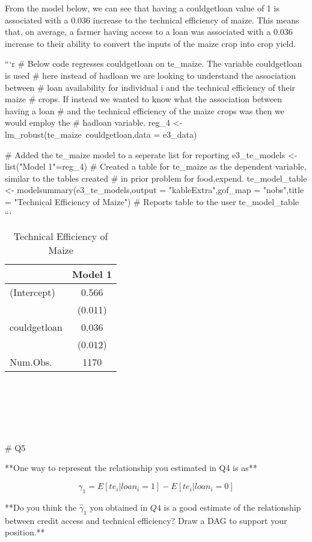 \documentclass[
]{article}
\begin{document}
\begin{}
From the model below, we can see that having a couldgetloan value of 1 is associated with a 0.036 increase to the technical efficiency of maize. This means that, on average, a farmer having access to a loan was associated with a 0.036 increase to their ability to convert the inputs of the maize crop into crop yield. 
\

```r
# Below code regresses couldgetloan on te_maize. The variable couldgetloan is used
# here instead of hadloan we are looking to understand the association between 
# loan availability for individual i and the technical efficiency of their maize
# crops. If instead we wanted to know what the association between having a loan
# and the technical efficiency of the maize crops was then we would employ the
# hadloan variable. 
reg_4 <- lm_robust(te_maize~couldgetloan,data = e3_data)

# Added the te_maize model to a seperate list for reporting
e3_te_models <- list("Model 1"=reg_4)
# Created a table for te_maize as the dependent variable, similar to the tables created
# in prior problem for food.expend. 
te_model_table <- modelsummary(e3_te_models,output = "kableExtra",gof_map = "nobs",title = "Technical Efficiency of Maize") %
# Reports table to the user
te_model_table
```

\begin{table}

\caption{\label{tab:unnamed-chunk-7}Technical Efficiency of Maize}
\centering
\begin{tabular}[t]{lc}
\toprule
  & Model 1\\
\midrule
(Intercept) & \num{0.566}\\
 & (\num{0.011})\\
couldgetloan & \num{0.036}\\
 & (\num{0.012})\\
\midrule
Num.Obs. & \num{1170}\\
\bottomrule
\end{tabular}
\end{table}
\

\

\


# Q5

**One way to represent the relationship you estimated in Q4 is as**

$$\gamma_1 = E[te_i|loan_i = 1] - E[te_i|loan_i =0]$$

**Do you think the $\hat{\gamma}_1$ you obtained in $Q4$ is a good estimate of the relationship between credit access and technical efficiency? Draw a DAG to support your position.**



\end{}
\end{document}
